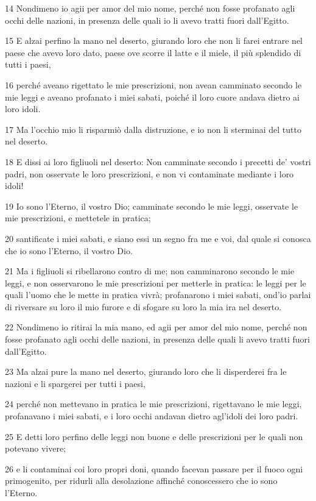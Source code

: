 \par 14 Nondimeno io agii per amor del mio nome, perché non fosse profanato agli occhi delle nazioni, in presenza delle quali io li avevo tratti fuori dall'Egitto.
\par 15 E alzai perfino la mano nel deserto, giurando loro che non li farei entrare nel paese che avevo loro dato, paese ove scorre il latte e il miele, il più splendido di tutti i paesi,
\par 16 perché aveano rigettato le mie prescrizioni, non avean camminato secondo le mie leggi e aveano profanato i miei sabati, poiché il loro cuore andava dietro ai loro idoli.
\par 17 Ma l'occhio mio li risparmiò dalla distruzione, e io non li sterminai del tutto nel deserto.
\par 18 E dissi ai loro figliuoli nel deserto: Non camminate secondo i precetti de' vostri padri, non osservate le loro prescrizioni, e non vi contaminate mediante i loro idoli!
\par 19 Io sono l'Eterno, il vostro Dio; camminate secondo le mie leggi, osservate le mie prescrizioni, e mettetele in pratica;
\par 20 santificate i miei sabati, e siano essi un segno fra me e voi, dal quale si conosca che io sono l'Eterno, il vostro Dio.
\par 21 Ma i figliuoli si ribellarono contro di me; non camminarono secondo le mie leggi, e non osservarono le mie prescrizioni per metterle in pratica: le leggi per le quali l'uomo che le mette in pratica vivrà; profanarono i miei sabati, ond'io parlai di riversare su loro il mio furore e di sfogare su loro la mia ira nel deserto.
\par 22 Nondimeno io ritirai la mia mano, ed agii per amor del mio nome, perché non fosse profanato agli occhi delle nazioni, in presenza delle quali li avevo tratti fuori dall'Egitto.
\par 23 Ma alzai pure la mano nel deserto, giurando loro che li disperderei fra le nazioni e li spargerei per tutti i paesi,
\par 24 perché non mettevano in pratica le mie prescrizioni, rigettavano le mie leggi, profanavano i miei sabati, e i loro occhi andavan dietro agl'idoli dei loro padri.
\par 25 E detti loro perfino delle leggi non buone e delle prescrizioni per le quali non potevano vivere;
\par 26 e li contaminai coi loro propri doni, quando facevan passare per il fuoco ogni primogenito, per ridurli alla desolazione affinché conoscessero che io sono l'Eterno.
